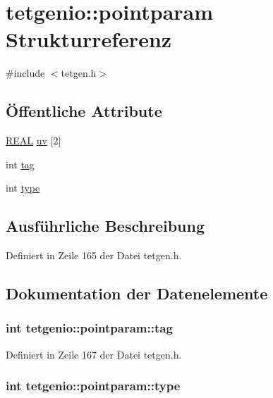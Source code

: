 \hypertarget{structtetgenio_1_1pointparam}{\section{tetgenio\-:\-:pointparam Strukturreferenz}
\label{structtetgenio_1_1pointparam}
}


{\ttfamily \#include $<$tetgen.\-h$>$}

\subsection*{Öffentliche Attribute}
\begin{DoxyCompactItemize}
\item 
\hyperlink{tetgen_8h_a4b654506f18b8bfd61ad2a29a7e38c25}{R\-E\-A\-L} \hyperlink{structtetgenio_1_1pointparam_a043a61660f4b9f0e164c91692fdb0ee5}{uv} \mbox{[}2\mbox{]}
\item 
int \hyperlink{structtetgenio_1_1pointparam_aa7ad61c79f963c3d198d5f48f5501f52}{tag}
\item 
int \hyperlink{structtetgenio_1_1pointparam_a172c5af02af4fe6ab385df812c1ea1ff}{type}
\end{DoxyCompactItemize}


\subsection{Ausführliche Beschreibung}


Definiert in Zeile 165 der Datei tetgen.\-h.



\subsection{Dokumentation der Datenelemente}
\hypertarget{structtetgenio_1_1pointparam_aa7ad61c79f963c3d198d5f48f5501f52}{
\subsubsection[{tag}]{\setlength{\rightskip}{0pt plus 5cm}int tetgenio\-::pointparam\-::tag}}\label{structtetgenio_1_1pointparam_aa7ad61c79f963c3d198d5f48f5501f52}


Definiert in Zeile 167 der Datei tetgen.\-h.

\hypertarget{structtetgenio_1_1pointparam_a172c5af02af4fe6ab385df812c1ea1ff}{
\subsubsection[{type}]{\setlength{\rightskip}{0pt plus 5cm}int tetgenio\-::pointparam\-::type}}\label{structtetgenio_1_1pointparam_a172c5af02af4fe6ab385df812c1ea1ff}


